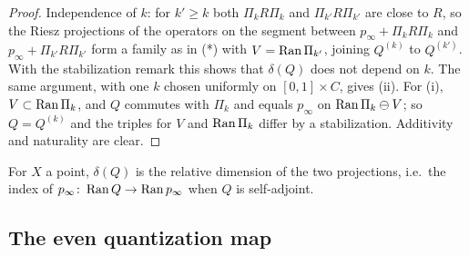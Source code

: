 \begin{proof}
  Independence of $k$: for $k'\ge k$ both $\Pi_kR\Pi_k$ and $\Pi_{k'}R\Pi_{k'}$ are close to
  $R$, so the Riesz projections of the operators on the segment between
  $p_\infty+\Pi_kR\Pi_k$ and $p_\infty+\Pi_{k'}R\Pi_{k'}$ form a family as in (*) with
  $V=\operatorname{Ran}\Pi_{k'}$, joining $Q^{(k)}$ to $Q^{(k')}$. With the stabilization remark this
  shows that $\delta(Q)$ does not depend on $k$. The same argument, with one $k$ chosen
  uniformly on $[0,1]\times C$, gives (ii). For (i), $V\subset\operatorname{Ran}\Pi_k$, and $Q$ commutes
  with $\Pi_k$ and equals $p_\infty$ on $\operatorname{Ran}\Pi_k\ominus V$; so $Q=Q^{(k)}$ and the triples
  for $V$ and $\operatorname{Ran}\Pi_k$ differ by a stabilization. Additivity and naturality are clear.
\end{proof}

For $X$ a point, $\delta(Q)$ is the relative dimension of the two projections, i.e.\
the index of $p_\infty\colon\operatorname{Ran} Q\to\operatorname{Ran} p_\infty$ when $Q$ is self-adjoint.

\subsection{The even quantization map}

